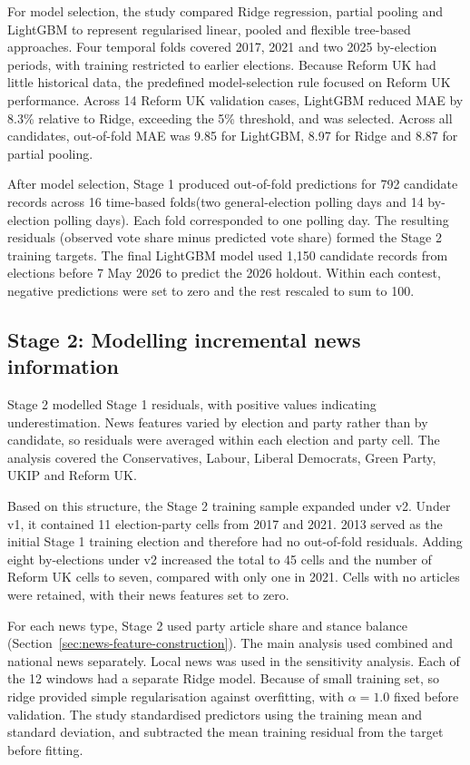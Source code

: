 \documentclass[final-report]{report-template}
\begin{document}
For model selection, the study compared Ridge regression, partial pooling and LightGBM \parencite{KE2017LIGHTGBM} to represent regularised linear, pooled and flexible tree-based approaches. Four temporal folds covered 2017, 2021 and two 2025 by-election periods, with training restricted to earlier elections. Because Reform UK had little historical data, the predefined model-selection rule focused on Reform UK performance. Across 14 Reform UK validation cases, LightGBM reduced MAE by 8.3\% relative to Ridge, exceeding the 5\% threshold, and was selected. Across all candidates, out-of-fold MAE was 9.85 for LightGBM, 8.97 for Ridge and 8.87 for partial pooling.

After model selection, Stage 1 produced out-of-fold predictions for 792 candidate records across 16 time-based folds(two general-election polling days and 14 by-election polling days). Each fold corresponded to one polling day. The resulting residuals (observed vote share minus predicted vote share) formed the Stage 2 training targets. The final LightGBM model used 1,150 candidate records from elections before 7 May 2026 to predict the 2026 holdout. Within each contest, negative predictions were set to zero and the rest rescaled to sum to 100.

\subsection{Stage 2: Modelling incremental news information}
\label{sec:stage2}
Stage 2 modelled Stage 1 residuals, with positive values indicating underestimation. News features varied by election and party rather than by candidate, so residuals were averaged within each election and party cell. The analysis covered the Conservatives, Labour, Liberal Democrats, Green Party, UKIP and Reform UK.

Based on this structure, the Stage 2 training sample expanded under v2. Under v1, it contained 11 election-party cells from 2017 and 2021. 2013 served as the initial Stage 1 training election and therefore had no out-of-fold residuals. Adding eight by-elections under v2 increased the total to 45 cells and the number of Reform UK cells to seven, compared with only one in 2021. Cells with no articles were retained, with their news features set to zero.

For each news type, Stage 2 used party article share and stance balance (Section~\ref{sec:news-feature-construction}). The main analysis used combined and national news separately. Local news was used in the sensitivity analysis. Each of the 12 windows had a separate Ridge model. Because of small training set, so ridge provided simple regularisation against overfitting, with $\alpha = 1.0$ fixed before validation. The study standardised predictors using the training mean and standard deviation, and subtracted the mean training residual from the target before fitting.
\end{document}
